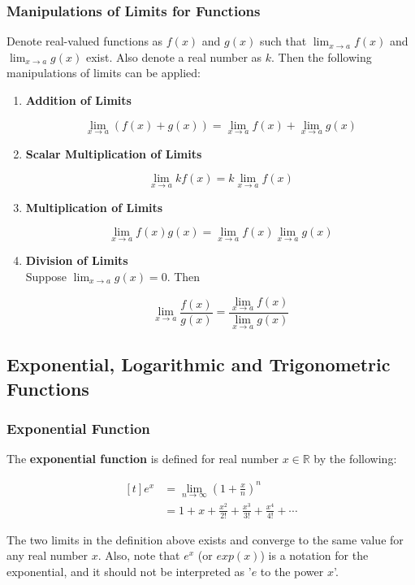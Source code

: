 \documentclass[a4paper,12pt]{article}
\newcommand{\s}{\vspace{1mm}}
\newcommand{\n}{\vspace{3mm}}
\newcommand{\R}{\mathbb{R}}
\newenvironment{alist}{ %
\begin{enumerate}[label=(\alph*)]
}{
\end{enumerate}
}
\begin{document}
\subsubsection{Manipulations of Limits for Functions}
Denote real-valued functions as $f(x)$ and $g(x)$ such that $\lim_{x\to a}f(x)$ and $\lim_{x\to a}g(x)$ exist. Also denote a real number as $k$. Then the following manipulations of limits can be applied:

\begin{alist}
  \item \textbf{Addition of Limits}

  $$\lim_{x\to a}(f(x)+g(x))=\lim_{x\to a}f(x)+\lim_{x\to a}g(x)$$

  \item \textbf{Scalar Multiplication of Limits}

  $$\lim_{x\to a}kf(x)=k\lim_{x\to a}f(x)$$

  \item \textbf{Multiplication of Limits}

  $$\lim_{x\to a}f(x)g(x)=\lim_{x\to a}f(x)\lim_{x\to a}g(x)$$

  \item \textbf{Division of Limits}\\
  Suppose $\lim_{x\to a}g(x)=0$. Then

  $$\lim_{x\to a}\frac{f(x)}{g(x)}=\frac{\lim_{x\to a}f(x)}{\lim_{x\to a}g(x)}$$
\end{alist}

\subsection{Exponential, Logarithmic and Trigonometric Functions}
\subsubsection{Exponential Function}
The \textbf{exponential function} is defined for real number $x\in \R$ by the following:

$$\begin{aligned}[t]
  e^{x}&=\lim_{n\to \infty}\left( 1+\frac{x}{n}\right)^{n}\\
  &=1+x+\frac{x^{2}}{2!}+\frac{x^{3}}{3!}+\frac{x^{4}}{4!}+\cdots
\end{aligned}$$\s

The two limits in the definition above exists and converge to the same value for any real number $x$. Also, note that $e^{x}$ (or $exp(x)$) is a notation for the exponential, and it should not be interpreted as '$e$ to the power $x$'.\n
\end{document}
